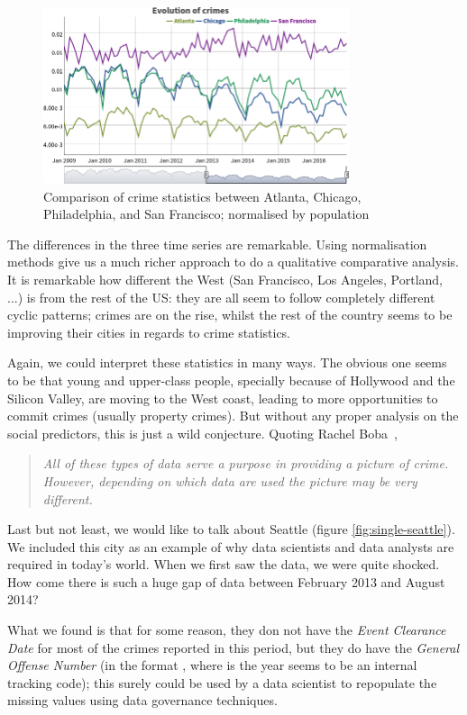 \begin{figure}[H]
	\centering
	\includegraphics[width=0.8\textwidth]{images/pop}
	\caption{Comparison of crime statistics between Atlanta, Chicago, Philadelphia, and San Francisco; normalised by population}
	\label{fig:comp-pop}
\end{figure}

The differences in the three time series are remarkable. Using normalisation methods give us a much richer approach to do a qualitative comparative analysis. It is remarkable how different the West (San Francisco, Los Angeles, Portland, ...) is from the rest of the US: they are all seem to follow completely different cyclic patterns; crimes are on the rise, whilst the rest of the country seems to be improving their cities in regards to crime statistics.

Again, we could interpret these statistics in many ways. The obvious one seems to be that young and upper-class people, specially because of Hollywood and the Silicon Valley, are moving to the West coast, leading to more opportunities to commit crimes (usually property crimes). But without any proper analysis on the social predictors, this is just a wild conjecture. Quoting Rachel Boba~\cite{Boba2004},
\begin{quotation}
    \emph{All of these types of data serve a purpose in providing a picture of crime. However, depending on which data are used the picture may be very different.}
\end{quotation}


\bigskip
Last but not least, we would like to talk about Seattle (figure \ref{fig:single-seattle}). We included this city as an example of why data scientists and data analysts are required in today's world. When we first saw the data, we were quite shocked. How come there is such a huge gap of data between February 2013 and August 2014?

What we found is that for some reason, they don not have the \emph{Event Clearance Date} for most of the crimes reported in this period, but they do have the \emph{General Offense Number} (in the format , where  is the year  seems to be an internal tracking code); this surely could be used by a data scientist to repopulate the missing values using data governance techniques.

